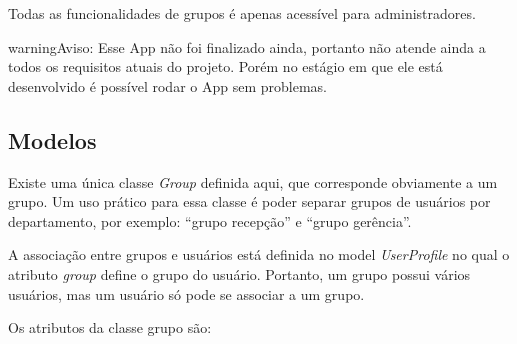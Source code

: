 \documentclass[letterpaper,10pt,brazil]{sphinxmanual}
\begin{document}
Todas as funcionalidades de grupos é apenas acessível para administradores.

\begin{notice}{warning}{Aviso:}
Esse App não foi finalizado ainda, portanto não atende ainda a todos os requisitos atuais do projeto. Porém no estágio em que ele está desenvolvido é possível rodar o App sem problemas.
\end{notice}


\subsection{Modelos}
\label{apps/groups:modelos}\label{apps/groups:module-groups.models}
Existe uma única classe \emph{Group} definida aqui, que corresponde obviamente a um grupo. Um uso prático para essa classe é poder separar grupos de usuários por departamento, por exemplo: ``grupo recepção'' e ``grupo gerência''.

A associação entre grupos e usuários está definida no model \emph{UserProfile} no qual o atributo \emph{group} define o grupo do usuário. Portanto, um grupo possui vários usuários, mas um usuário só pode se associar a um grupo.

Os atributos da classe grupo são:
\end{document}
